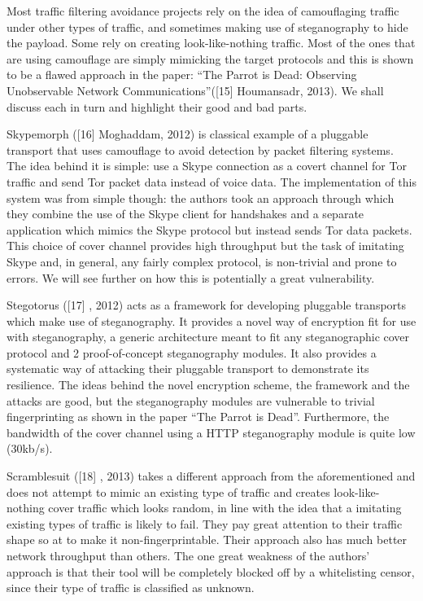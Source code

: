 \documentclass[11pt]{article} %
\begin{document}

Most traffic filtering avoidance projects rely on the idea of camouflaging traffic under other types of traffic, and sometimes making use of steganography to hide the payload. Some rely on creating look-like-nothing traffic. Most of the ones that are using camouflage are simply mimicking the target protocols and this is shown to be a flawed approach in the paper: “The Parrot is Dead: Observing Unobservable Network Communications”([15] Houmansadr, 2013). We shall discuss each in turn and highlight their good and bad parts.

Skypemorph ([16] Moghaddam, 2012) is classical example of a pluggable transport that uses camouflage to avoid detection by packet filtering systems. The idea behind it is simple: use a Skype connection as a covert channel for Tor traffic and send Tor packet data instead of voice data. The implementation of this system was from simple though: the authors took an approach through which they combine the use of the Skype client for handshakes and a separate application which mimics the Skype protocol but instead sends Tor data packets. This choice of cover channel provides high throughput but the task of imitating Skype and, in general, any fairly complex protocol, is non-trivial and prone to errors. We will see further on how this is potentially a great vulnerability.

Stegotorus ([17] , 2012) acts as a framework for developing pluggable transports which make use of steganography. It provides a novel way of encryption fit for use with steganography, a generic architecture meant to fit any steganographic cover protocol and 2 proof-of-concept steganography modules. It also provides a systematic way of attacking their pluggable transport to demonstrate its resilience. The ideas behind the novel encryption scheme, the framework and the attacks are good, but the steganography modules are vulnerable to trivial fingerprinting as shown in the paper “The Parrot is Dead”. Furthermore, the bandwidth of the cover channel using a HTTP steganography module is quite low (30kb/s).

Scramblesuit ([18] , 2013) takes a different approach from the aforementioned and does not attempt to mimic an existing type of traffic and creates look-like-nothing cover traffic which looks random, in line with the idea that a imitating existing types of traffic is likely to fail. They pay great attention to their traffic shape so at to make it non-fingerprintable. Their approach also has much better network throughput than others. The one great weakness of the authors’ approach is that their tool will be completely blocked off by a whitelisting censor, since their type of  traffic is classified as unknown.
\end{document}
